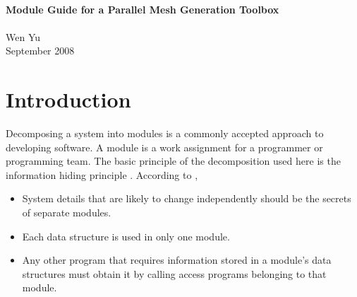 \documentclass[12pt,titlepage]{article}
\author{Wen Yu}
\begin{document}
\begin{titlepage}

\newcommand{\texttl}{\textsf} %
\newcommand{\textau}{\textsf} %

\begin{center}
 
\HRule \\[0.4cm]
{ \huge \bfseries \texttl{Module Guide for a Parallel Mesh Generation Toolbox}}\\[0.4cm]
 
\HRule \\[2cm]

\textau{\LARGE Wen Yu}\\[2cm]
 
\textau{\LARGE {September 2008}}
 
\vfill
 
\hfill
\textau{\LARGE
{}
}
\end{center}

\end{titlepage}

\tableofcontents

\newpage
\section{Introduction}
Decomposing a system into modules is a commonly accepted approach to developing software. A module is a work assignment for a programmer or programming team. The basic principle of the decomposition used here is the information hiding principle \citep{Parnas1984}. According to \citet{Parnas1984}, 
\begin{itemize}
\item System details that are likely to change independently should be the secrets of separate modules.
\item Each data structure is used in only one module.
\item Any other program that requires information stored in a module's data structures must obtain it by calling access programs belonging to that module.
\end{itemize}
\end{document}
